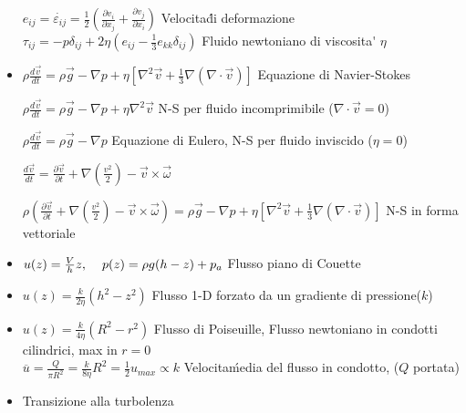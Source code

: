 \documentclass[a4paper]{article}
\begin{document}
\begin{itemize}
	$e_{ij}= \dot{\varepsilon_{ij}}= \frac{1}{2}(\frac{\partial v_i}{\partial x_j}+\frac{\partial v_j}{\partial x_i})$ Velocita\' di deformazione\\
	$\tau_{ij}=-p \delta_{ij} + 2 \eta (e_{ij}-\frac{1}{3}e_{kk}\delta_{ij})$ Fluido newtoniano di viscosita\' $\eta$
	
	\item $\rho \frac{d \overrightarrow{v}}{dt} = \rho \overrightarrow{g}- \nabla p + \eta[\nabla^2 \overrightarrow{v} + \frac{1}{3}\nabla(\nabla \cdot \overrightarrow{v})]$ \hspace{0.3cm} Equazione di Navier-Stokes
	
	$\rho \frac{d \overrightarrow{v}}{dt} = \rho \overrightarrow{g}- \nabla p + \eta\nabla^2 \overrightarrow{v}$ \hspace{0.3cm} N-S per fluido incomprimibile ($\nabla \cdot \overrightarrow{v}=0$)
	
	$\rho \frac{d \overrightarrow{v}}{dt} = \rho \overrightarrow{g}- \nabla p$ \hspace{0.3cm} Equazione di Eulero, N-S per fluido inviscido ($\eta = 0$)
	
	$\frac{d\overrightarrow{v}}{dt}=\frac{\partial \overrightarrow{v}}{\partial t}+\nabla (\frac{v^2}{2})-\overrightarrow{v} \times \overrightarrow{\omega}$
	
	$\rho  (\frac{\partial \overrightarrow{v}}{\partial t}+\nabla (\frac{v^2}{2})-\overrightarrow{v} \times \overrightarrow{\omega}) = \rho \overrightarrow{g}- \nabla p + \eta[\nabla^2 \overrightarrow{v} + \frac{1}{3}\nabla(\nabla \cdot \overrightarrow{v})]$ \hspace{0.3cm} N-S in forma vettoriale
	
	\item $u(z) = \frac{V}{h}z, \hspace{0.4cm} p(z)=\rho g (h-z)+p_a$ Flusso piano di Couette
	
	\item $u(z)=\frac{k}{2 \eta} (h^2-z^2) $ Flusso 1-D forzato da un gradiente di pressione($k$)
	
	\item $u(z)=\frac{k}{4 \eta} (R^2-r^2) $ Flusso di Poiseuille, Flusso newtoniano in condotti cilindrici, max in $r=0$\\
	$\overline{u}=\frac{Q}{\pi R^2}=\frac{k}{8\eta}R^2=\frac{1}{2}u_{max}\propto k$ Velocita\' media del flusso in condotto, ($Q$ portata)
	
	\item Transizione alla turbolenza
	

\end{itemize}
\end{document}
